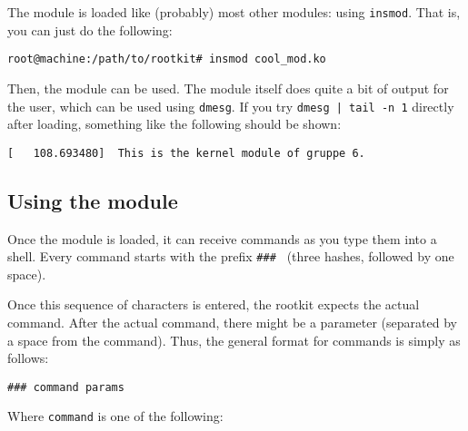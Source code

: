 \documentclass[10pt, letterpaper]{article}
\begin{document}
The module is loaded like (probably) most other modules: using \texttt{insmod}. That is, you can just do the following:

\begin{verbatim}
root@machine:/path/to/rootkit# insmod cool_mod.ko
\end{verbatim}

Then, the module can be used. The module itself does quite a bit of output for the user, which can be used using \texttt{dmesg}. If you try \texttt{dmesg | tail -n 1} directly after loading, something like the following should be shown:

\begin{verbatim}
[   108.693480]  This is the kernel module of gruppe 6.
\end{verbatim}

\subsection{Using the module}

Once the module is loaded, it can receive commands as you type them into a shell. Every command starts with the prefix \texttt{\#\#\# } (three hashes, followed by one space).

Once this sequence of characters is entered, the rootkit expects the actual command. After the actual command, there might be a parameter (separated by a space from the command). Thus, the general format for commands is simply as follows:

\begin{verbatim}
### command params
\end{verbatim}

Where \texttt{command} is one of the following:
\end{document}
